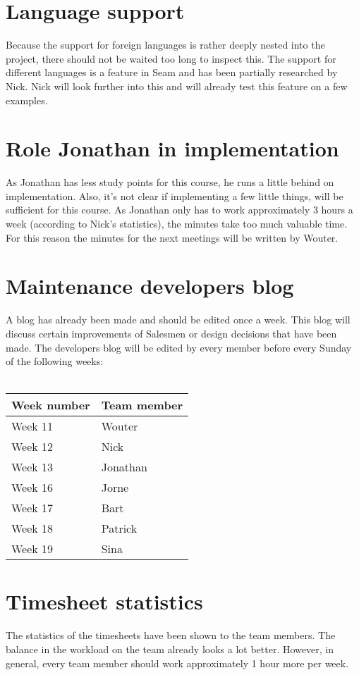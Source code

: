 \documentclass[a4paper, 12pt]{article}
\begin{document}
	\section{Language support}
Because the support for foreign languages is rather deeply nested into the project, there should not be waited too long to inspect this. The support for different languages is a feature in Seam and has been partially researched by Nick. Nick will look further into this and will already test this feature on a few examples.
	\section{Role Jonathan in implementation}
As Jonathan has less study points for this course, he runs a little behind on implementation. Also, it's not clear if implementing a few little things, will be sufficient for this course. As Jonathan only has to work approximately 3 hours a week (according to Nick's statistics), the minutes take too much valuable time. For this reason the minutes for the next meetings will be written by Wouter.
	\section{Maintenance developers blog}
A blog has already been made and should be edited once a week. This blog will discuss certain improvements of Salesmen or design decisions that have been made.
The developers blog will be edited by every member before every Sunday of the following weeks:\\ \\
			\begin{tabular}{l | l }
				\textbf{Week number} & \textbf{Team member} \\
				\hline
				Week 11 &  Wouter\\
				\hline
				Week 12 &  Nick\\
				\hline
				Week 13 &  Jonathan\\
				\hline
				Week 16 &  Jorne\\
				\hline
				Week 17 &  Bart\\
				\hline
				Week 18 &  Patrick\\
				\hline
				Week 19 &  Sina\\
			\end{tabular}
	\section{Timesheet statistics}
The statistics of the timesheets have been shown to the team members. The balance in the workload on the team already looks a lot better. However, in general, every team member should work approximately 1 hour more per week.
\end{document}
